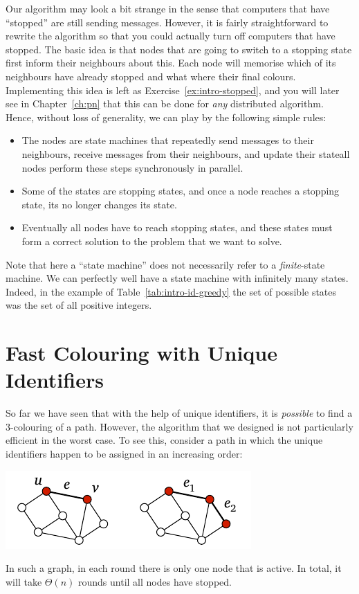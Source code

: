 Our algorithm may look a bit strange in the sense that computers that have ``stopped'' are still sending messages. However, it is fairly straightforward to rewrite the algorithm so that you could actually turn off computers that have stopped. The basic idea is that nodes that are going to switch to a stopping state first inform their neighbours about this. Each node will memorise which of its neighbours have already stopped and what where their final colours. Implementing this idea is left as Exercise~\ref{ex:intro-stopped}, and you will later see in Chapter~\ref{ch:pn} that this can be done for \emph{any} distributed algorithm. Hence, without loss of generality, we can play by the following simple rules:
\begin{itemize}
    \item The nodes are state machines that repeatedly send messages to their neighbours, receive messages from their neighbours, and update their state\mydash all nodes perform these steps synchronously in parallel.
    \item Some of the states are stopping states, and once a node reaches a stopping state, its no longer changes its state.
    \item Eventually all nodes have to reach stopping states, and these states must form a correct solution to the problem that we want to solve.
\end{itemize}
Note that here a ``state machine'' does not necessarily refer to a \emph{finite}-state machine. We can perfectly well have a state machine with infinitely many states. Indeed, in the example of Table~\ref{tab:intro-id-greedy} the set of possible states was the set of all positive integers.


\section{Fast Colouring with Unique Identifiers}\label{sec:intro-pos-id-fast}

So far we have seen that with the help of unique identifiers, it is \emph{possible} to find a $3$-colouring of a path. However, the algorithm that we designed is not particularly efficient in the worst case. To see this, consider a path in which the unique identifiers happen to be assigned in an increasing order:
\begin{center}
    \includegraphics[page=\PIntroIdBad]{figs.pdf}
\end{center}
In such a graph, in each round there is only one node that is active. In total, it will take $\Theta(n)$ rounds until all nodes have stopped.

